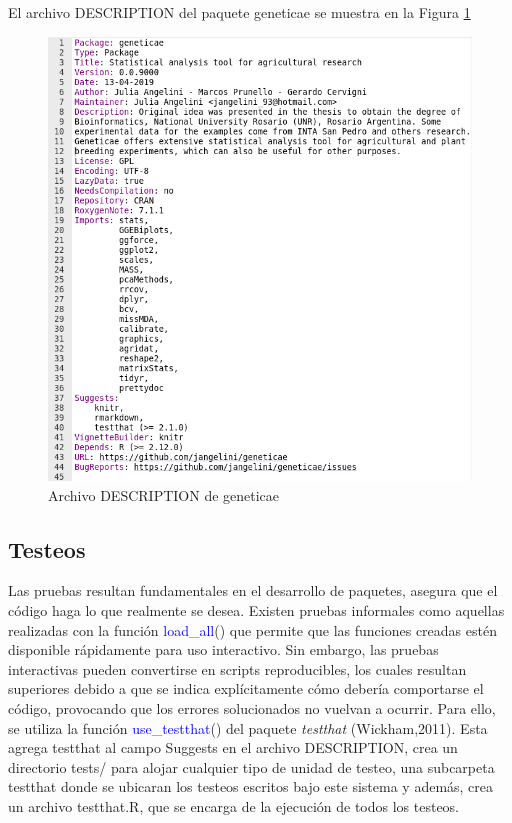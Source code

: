 El archivo DESCRIPTION del paquete geneticae se muestra en la Figura \ref{fig:fig33}

 \begin{figure}[H]
	\begin{center}
		\includegraphics[width=13cm]{./Graficos/DESCRIPTION.png}	
	\end{center}
	\caption{Archivo DESCRIPTION de geneticae}
	\label{fig:fig33}
\end{figure}


\subsection{Testeos}

Las pruebas resultan fundamentales en el desarrollo de paquetes, asegura que el código haga lo que realmente se desea. Existen pruebas informales como aquellas realizadas con la función \textcolor{blue}{load\_all}() que permite que las funciones creadas estén disponible rápidamente para uso interactivo. Sin embargo, las pruebas interactivas pueden convertirse en scripts reproducibles, los cuales resultan superiores debido a que se indica explícitamente cómo debería comportarse el código, provocando que los errores solucionados no vuelvan a ocurrir. Para ello, se utiliza la función \textcolor{blue}{use\_testthat}() del paquete \emph{testthat} (Wickham,2011). Esta agrega testthat al campo Suggests en el archivo DESCRIPTION, crea un directorio tests/ para alojar cualquier tipo de unidad de testeo, una subcarpeta testthat donde se ubicaran los testeos escritos bajo este sistema y además, crea un archivo testthat.R, que se encarga de la ejecución de todos los testeos.  


